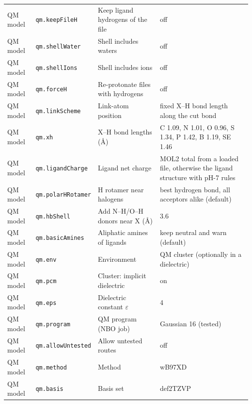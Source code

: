 {\begin{longtable}{llp{4.2cm}l}
QM model & \texttt{qm.keepFileH} & Keep ligand hydrogens of the file & \parbox[t]{5.0cm}{\raggedright off}\\
QM model & \texttt{qm.shellWater} & Shell includes waters & \parbox[t]{5.0cm}{\raggedright off}\\
QM model & \texttt{qm.shellIons} & Shell includes ions & \parbox[t]{5.0cm}{\raggedright off}\\
QM model & \texttt{qm.forceH} & Re-protonate files with hydrogens & \parbox[t]{5.0cm}{\raggedright off}\\
QM model & \texttt{qm.linkScheme} & Link-atom position & \parbox[t]{5.0cm}{\raggedright fixed X--H bond length along the cut bond}\\
QM model & \texttt{qm.xh} & X--H bond lengths (\AA{}) & \parbox[t]{5.0cm}{\raggedright C 1.09, N 1.01, O 0.96, S 1.34, P 1.42, B 1.19, SE 1.46}\\
QM model & \texttt{qm.ligandCharge} & Ligand net charge & \parbox[t]{5.0cm}{\raggedright MOL2 total from a loaded file, otherwise the ligand structure with pH-7 rules}\\
QM model & \texttt{qm.polarHRotamer} & H rotamer near halogens & \parbox[t]{5.0cm}{\raggedright best hydrogen bond, all acceptors alike (default)}\\
QM model & \texttt{qm.hbShell} & Add N--H/O--H donors near X (\AA{}) & \parbox[t]{5.0cm}{\raggedright 3.6}\\
QM model & \texttt{qm.basicAmines} & Aliphatic amines of ligands & \parbox[t]{5.0cm}{\raggedright keep neutral and warn (default)}\\
QM model & \texttt{qm.env} & Environment & \parbox[t]{5.0cm}{\raggedright QM cluster (optionally in a dielectric)}\\
QM model & \texttt{qm.pcm} & Cluster: implicit dielectric & \parbox[t]{5.0cm}{\raggedright on}\\
QM model & \texttt{qm.eps} & Dielectric constant $\varepsilon$ & \parbox[t]{5.0cm}{\raggedright 4}\\
QM model & \texttt{qm.program} & QM program (NBO job) & \parbox[t]{5.0cm}{\raggedright Gaussian 16 (tested)}\\
QM model & \texttt{qm.allowUntested} & Allow untested routes & \parbox[t]{5.0cm}{\raggedright off}\\
QM model & \texttt{qm.method} & Method & \parbox[t]{5.0cm}{\raggedright wB97XD}\\
QM model & \texttt{qm.basis} & Basis set & \parbox[t]{5.0cm}{\raggedright def2TZVP}\\

\end{longtable}}
